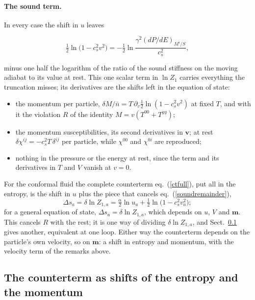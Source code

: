 \documentclass[11pt,aps,preprint,nofootinbib,superscriptaddress,tightenlines]{revtex4-2}
\def\st{\begin{equation}}
\def\stp{\end{equation}}
\def\Eq#1{eq.~(\ref{#1})}
\def\Sect#1{Sect.~\ref{#1}}
\let\oldparagraph\paragraph
\renewcommand{\paragraph}{\par\bigskip\oldparagraph}
\begin{document}
\paragraph{The sound term.}  In every case the shift in $u$ leaves
\begin{keyeq}
\st
\tfrac12\ln\big(1-c_s^2v^2\big)=-\tfrac12\ln\frac{\gamma^2(dP/dE)_{M^i/S}}{c_s^2} ,
\label{soundremainder}
\stp
\end{keyeq}
minus one half the logarithm of the ratio of the sound stiffness on the moving adiabat to its value at rest.  This one scalar term in $\ln Z_1$ carries everything the
truncation misses; its derivatives are the shifts left in the equation of state:
\begin{itemize}
\item the momentum per particle, $\delta M/\bar n=T\,\partial_v\tfrac12\ln(1-c_s^2v^2)$ at fixed $T$, and with it the violation $R$ of the identity $M=v(T^{00}+T^{yy})$;
\item the momentum susceptibilities, its second derivatives in $\bm v$; at rest $\delta\chi^{ij}=-c_s^2T\,\delta^{ij}$ per particle, while $\chi^{00}$ and $\chi^{0i}$ are reproduced;
\item nothing in the pressure or the energy at rest, since the term and its derivatives in $T$ and $V$ vanish at $v=0$.
\end{itemize}
For the conformal fluid the complete counterterm \Eq{ctfull}, put all in the entropy, is the shift in $u$ plus the piece that cancels \Eq{soundremainder},
\st
\Delta s_a=\delta\ln Z_{1,a}=\tfrac\alpha2\ln u_a+\tfrac12\ln\big(1-c_s^2v_a^2\big) ;
\stp
for a general equation of state, $\Delta s_a=\delta\ln Z_{1,a}$, which depends on $u$, $V$ and $\bm m$.  This cancels $R$ with the rest; it is one way of dividing $\delta\ln Z_{1,a}$, and
\Sect{sec:shifts} gives another, equivalent at one loop.  Either way the counterterm depends on the particle's own velocity, so on
$\bm m$: a shift in entropy and momentum, with the velocity term of the remarks above.

\subsection{The counterterm as shifts of the entropy and the momentum}
\label{sec:shifts}
\end{document}
